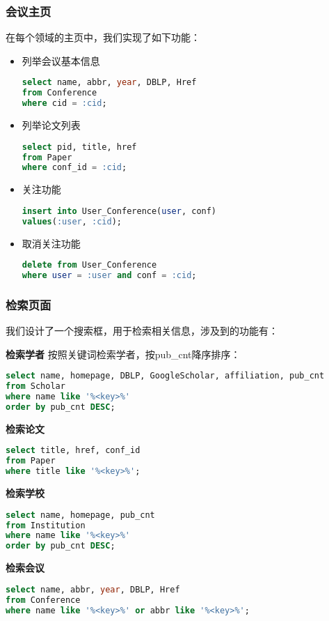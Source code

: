 \subsubsection{会议主页}
在每个领域的主页中，我们实现了如下功能：
\begin{itemize}
\item 列举会议基本信息
\begin{lstlisting}[language=SQL]
select name, abbr, year, DBLP, Href
from Conference
where cid = :cid;
\end{lstlisting}
\item 列举论文列表
\begin{lstlisting}[language=SQL]
select pid, title, href
from Paper
where conf_id = :cid;
\end{lstlisting}
\item 关注功能
\begin{lstlisting}[language=SQL]
insert into User_Conference(user, conf)
values(:user, :cid);
\end{lstlisting}
\item 取消关注功能
\begin{lstlisting}[language=SQL]
delete from User_Conference
where user = :user and conf = :cid;
\end{lstlisting}
\end{itemize}

\subsubsection{检索页面}

我们设计了一个搜索框，用于检索相关信息，涉及到的功能有：

{\bf 检索学者} 按照关键词检索学者，按pub\_cnt降序排序：
\begin{lstlisting}[language=SQL]
select name, homepage, DBLP, GoogleScholar, affiliation, pub_cnt
from Scholar
where name like '%<key>%'
order by pub_cnt DESC;
\end{lstlisting}

{\bf 检索论文}
\begin{lstlisting}[language=SQL]
select title, href, conf_id
from Paper
where title like '%<key>%';
\end{lstlisting}

{\bf 检索学校}
\begin{lstlisting}[language=SQL]
select name, homepage, pub_cnt
from Institution
where name like '%<key>%'
order by pub_cnt DESC;
\end{lstlisting}

{\bf 检索会议}
\begin{lstlisting}[language=SQL]
select name, abbr, year, DBLP, Href
from Conference
where name like '%<key>%' or abbr like '%<key>%';
\end{lstlisting}

